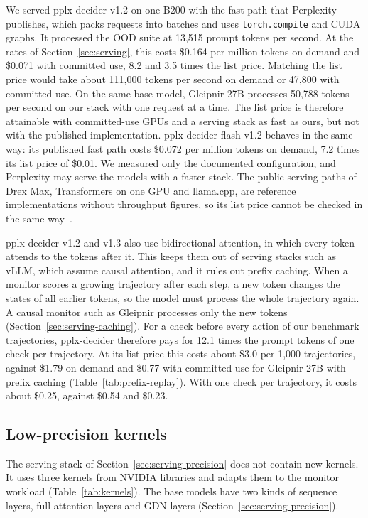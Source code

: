We served pplx-decider v1.2 on one B200 with the fast path that Perplexity publishes, which packs requests into batches and uses \texttt{torch.compile} and CUDA graphs.
It processed the OOD suite at 13,515 prompt tokens per second.
At the rates of Section~\ref{sec:serving}, this costs \$0.164 per million tokens on demand and \$0.071 with committed use, 8.2 and 3.5 times the list price.
Matching the list price would take about 111,000 tokens per second on demand or 47,800 with committed use.
On the same base model, Gleipnir 27B processes 50,788 tokens per second on our stack with one request at a time.
The list price is therefore attainable with committed-use GPUs and a serving stack as fast as ours, but not with the published implementation.
pplx-decider-flash v1.2 behaves in the same way: its published fast path costs \$0.072 per million tokens on demand, 7.2 times its list price of \$0.01.
We measured only the documented configuration, and Perplexity may serve the models with a faster stack.
The public serving paths of Drex Max, Transformers on one GPU and llama.cpp, are reference implementations without throughput figures, so its list price cannot be checked in the same way~\citep{dhankhar2026drex}.

pplx-decider v1.2 and v1.3 also use bidirectional attention, in which every token attends to the tokens after it.
This keeps them out of serving stacks such as vLLM, which assume causal attention, and it rules out prefix caching.
When a monitor scores a growing trajectory after each step, a new token changes the states of all earlier tokens, so the model must process the whole trajectory again.
A causal monitor such as Gleipnir processes only the new tokens (Section~\ref{sec:serving-caching}).
For a check before every action of our benchmark trajectories, pplx-decider therefore pays for 12.1 times the prompt tokens of one check per trajectory.
At its list price this costs about \$3.0 per 1,000 trajectories, against \$1.79 on demand and \$0.77 with committed use for Gleipnir 27B with prefix caching (Table~\ref{tab:prefix-replay}).
With one check per trajectory, it costs about \$0.25, against \$0.54 and \$0.23.

\subsection{Low-precision kernels}
\label{app:serving-kernels}

The serving stack of Section~\ref{sec:serving-precision} does not contain new kernels.
It uses three kernels from NVIDIA libraries and adapts them to the monitor workload (Table~\ref{tab:kernels}).
The base models have two kinds of sequence layers, full-attention layers and GDN layers (Section~\ref{sec:serving-precision}).

